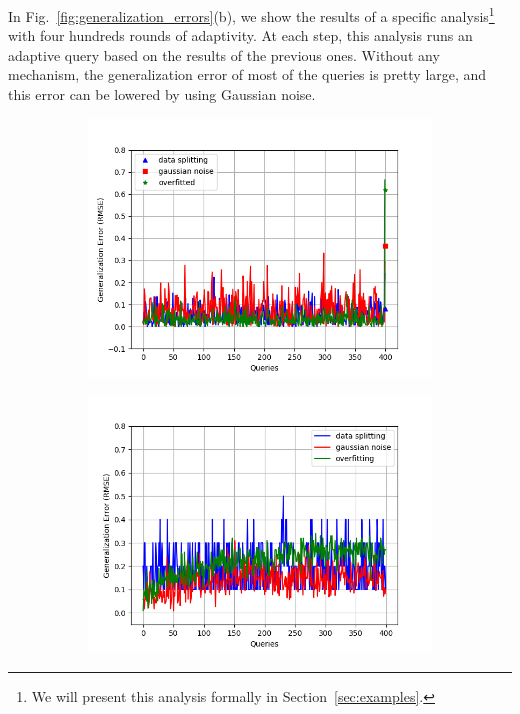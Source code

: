 In Fig.~\ref{fig:generalization_errors}(b), we show the results of a specific analysis\footnote{We will present this analysis formally in Section~\ref{sec:examples}.} with four hundreds rounds of adaptivity.
At each step, this analysis runs an adaptive query based on the results of the previous ones. Without any mechanism, the generalization error of most of the queries is pretty large, and this error can be lowered by using Gaussian noise. 
{\small
\begin{figure}
\centering
\begin{subfigure}{.322\textwidth}
\begin{centering}
\includegraphics[width=1.0\textwidth]{tworound.png}
\caption{}
\end{centering}
\end{subfigure}
\quad
\begin{subfigure}{.322\textwidth}
\begin{centering}
\includegraphics[width=1.0\textwidth]{multipleround.png}

\end{centering}
\end{subfigure}
\end{figure}}
